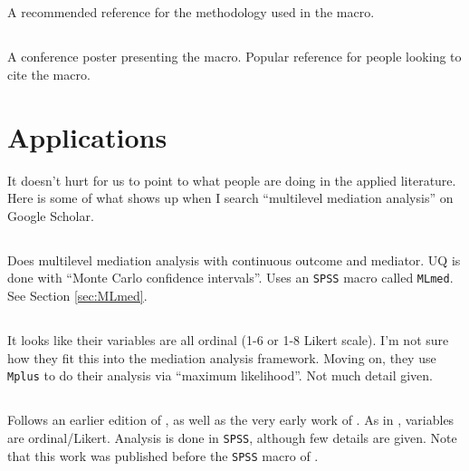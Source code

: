 \documentclass{report}
\begin{document}
\subsection{\citet{Hay20}}

A recommended reference for the methodology used in the macro.

\subsection{\citet{Roc17}}

A conference poster presenting the macro. Popular reference for people looking to cite the macro.


\section{Applications}

It doesn't hurt for us to point to what people are doing in the applied literature. Here is some of what shows up when I search ``multilevel mediation analysis'' on Google Scholar.

\subsection{\citet{Vea19}}

Does multilevel mediation analysis with continuous outcome and mediator. UQ is done with ``Monte Carlo confidence intervals''. Uses an \texttt{SPSS} macro called \texttt{MLmed}. See Section \ref{sec:MLmed}.

\subsection{\citet{Ara21}}

It looks like their variables are all ordinal (1-6 or 1-8 Likert scale). I'm not sure how they fit this into the mediation analysis framework. Moving on, they use \texttt{Mplus} to do their analysis via ``maximum likelihood''. Not much detail given.

\subsection{\citet{Hwa12}}

Follows an earlier edition of \citet{Mac17}, as well as the very early work of \citet{Bar86}. As in \citet{Ara21}, variables are ordinal/Likert. Analysis is done in \texttt{SPSS}, although few details are given. Note that this work was published before the \texttt{SPSS} macro of \citet{Roc19}.
\end{document}
